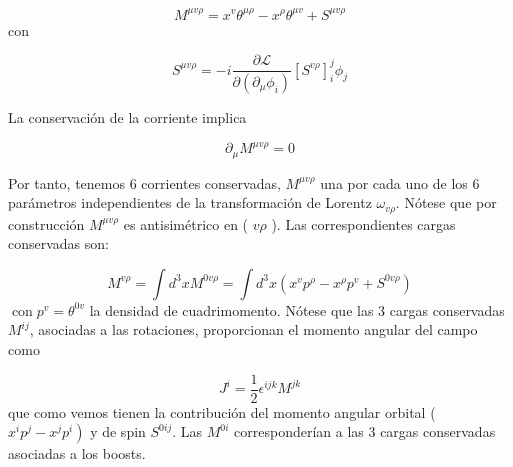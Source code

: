 \begin{equation*}
M^{\mu v \rho}=x^{v} \theta^{\mu \rho}-x^{\rho} \theta^{\mu v}+S^{\mu v \rho} \tag{3.73}
\end{equation*}
con

\begin{equation*}
S^{\mu v \rho}=-i \frac{\partial \mathscr{L}}{\partial\left(\partial_{\mu} \phi_{i}\right)}\left[S^{v \rho}\right]_{i}^{j} \phi_{j} \tag{3.74}
\end{equation*}

La conservación de la corriente implica

\begin{equation*}
\partial_{\mu} M^{\mu v \rho}=0 \tag{3.75}
\end{equation*}

Por tanto, tenemos 6 corrientes conservadas, $M^{\mu v \rho}$ una por cada uno de los 6 parámetros independientes de la transformación de Lorentz $\omega_{v \rho}$. Nótese que por construcción $M^{\mu v \rho}$ es antisimétrico en ( $v \rho$ ). Las correspondientes cargas conservadas son:

\begin{equation*}
M^{v \rho}=\int d^{3} x M^{0 v \rho}=\int d^{3} x\left(x^{v} p^{\rho}-x^{\rho} p^{v}+S^{0 v \rho}\right) \tag{3.76}
\end{equation*}
$\operatorname{con} p^{v}=\theta^{0 v}$ la densidad de cuadrimomento.
Nótese que las 3 cargas conservadas $M^{i j}$, asociadas a las rotaciones, proporcionan el momento angular del campo como

\begin{equation*}
J^{i}=\frac{1}{2} \epsilon^{i j k} M^{j k} \tag{3.77}
\end{equation*}
que como vemos tienen la contribución del momento angular orbital ( $\left.x^{i} p^{j}-x^{j} p^{i}\right)$ y de spin $S^{0 i j}$. Las $M^{0 i}$ corresponderían a las 3 cargas conservadas asociadas a los boosts.